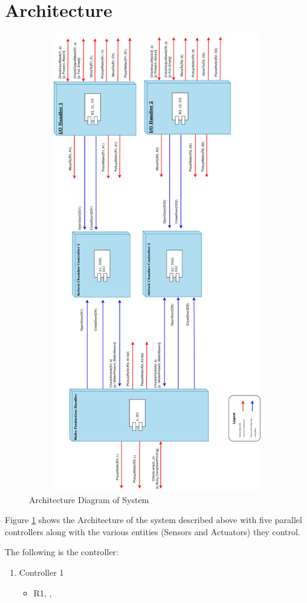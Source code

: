 \documentclass[a4paper,12pt]{article}
\begin{document}
\section{Architecture}
\begin{figure}[ht]
\centering
    \includegraphics[angle=90, width=15cm,height=20cm]{Architecture.jpg}
  \caption{Architecture Diagram of System}
  \label{fig:arch1}
\end{figure}
Figure \ref{fig:arch1} shows the Architecture of the system described above with five parallel controllers along with the various entities (Sensors and Actuators) they control.

The following is the controller:
\begin{enumerate}
\item Controller 1
\begin{itemize}
\item R1, ,  
\end{itemize}
\end{enumerate}
\end{document}
